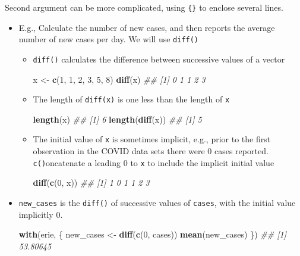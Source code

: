 \documentclass[
]{book}
\newenvironment{Shaded}{\begin{snugshade}}{\end{snugshade}}
\newcommand{\CommentTok}[1]{\textcolor[rgb]{0.56,0.35,0.01}{\textit{#1}}}
\newcommand{\DecValTok}[1]{\textcolor[rgb]{0.00,0.00,0.81}{#1}}
\newcommand{\KeywordTok}[1]{\textcolor[rgb]{0.13,0.29,0.53}{\textbf{#1}}}
\newcommand{\NormalTok}[1]{#1}
\newcommand{\StringTok}[1]{\textcolor[rgb]{0.31,0.60,0.02}{#1}}
\begin{document}
Second argument can be more complicated, using \texttt{\{\}} to enclose several lines.

\begin{itemize}
\item
  E.g., Calculate the number of new cases, and then reports the average number of new cases per day. We will use \texttt{diff()}

  \begin{itemize}
  \item
    \texttt{diff()} calculates the difference between successive values of a vector

\begin{Shaded}
\begin{Highlighting}[]
\NormalTok{x <-}\StringTok{ }\KeywordTok{c}\NormalTok{(}\DecValTok{1}\NormalTok{, }\DecValTok{1}\NormalTok{, }\DecValTok{2}\NormalTok{, }\DecValTok{3}\NormalTok{, }\DecValTok{5}\NormalTok{, }\DecValTok{8}\NormalTok{)}
\KeywordTok{diff}\NormalTok{(x)}
\CommentTok{## [1] 0 1 1 2 3}
\end{Highlighting}
\end{Shaded}
  \item
    The length of \texttt{diff(x)} is one less than the length of \texttt{x}

\begin{Shaded}
\begin{Highlighting}[]
\KeywordTok{length}\NormalTok{(x)}
\CommentTok{## [1] 6}
\KeywordTok{length}\NormalTok{(}\KeywordTok{diff}\NormalTok{(x))}
\CommentTok{## [1] 5}
\end{Highlighting}
\end{Shaded}
  \item
    The initial value of \texttt{x} is sometimes implicit, e.g., prior to the first observation in the COVID data sets there were 0 cases reported. \texttt{c()}oncatenate a leading 0 to \texttt{x} to include the implicit initial value

\begin{Shaded}
\begin{Highlighting}[]
\KeywordTok{diff}\NormalTok{(}\KeywordTok{c}\NormalTok{(}\DecValTok{0}\NormalTok{, x))}
\CommentTok{## [1] 1 0 1 1 2 3}
\end{Highlighting}
\end{Shaded}
  \end{itemize}
\item
  \texttt{new\_cases} is the \texttt{diff()} of successive values of \texttt{cases}, with the initial value implicitly 0.

\begin{Shaded}
\begin{Highlighting}[]
\KeywordTok{with}\NormalTok{(erie, \{}
\NormalTok{    new_cases <-}\StringTok{ }\KeywordTok{diff}\NormalTok{(}\KeywordTok{c}\NormalTok{(}\DecValTok{0}\NormalTok{, cases))}
    \KeywordTok{mean}\NormalTok{(new_cases)}
\NormalTok{\})}
\CommentTok{## [1] 53.80645}
\end{Highlighting}
\end{Shaded}
\end{itemize}
\end{document}
